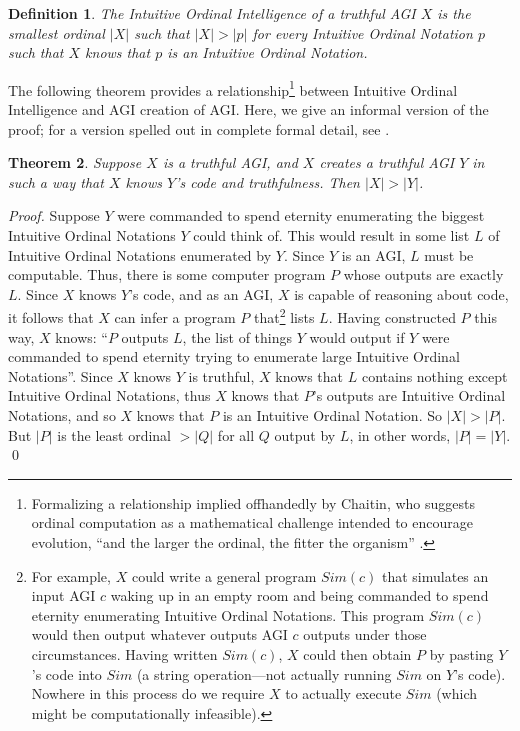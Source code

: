 \documentclass[runningheads]{llncs}
\newtheorem{mytheorem}{Theorem}
\newtheorem{mydefinition}[mytheorem]{Definition}
\begin{document}
\begin{mydefinition}
\label{maindefinition}
    The \emph{Intuitive Ordinal Intelligence} of a truthful AGI $X$ is the smallest
    ordinal $|X|$ such that $|X|>|p|$ for every Intuitive Ordinal Notation
    $p$ such that $X$ knows that $p$ is an
    Intuitive Ordinal Notation.
\end{mydefinition}

The following theorem provides a relationship\footnote{Formalizing a relationship implied
offhandedly by Chaitin, who suggests ordinal computation as a mathematical challenge
intended to encourage evolution, ``and the larger the ordinal,
the fitter the organism'' \cite{chaitin}.} between Intuitive Ordinal Intelligence
and AGI creation of AGI. Here, we give an informal version of the proof; for a version
spelled out in complete formal detail, see \cite{alexander2019measuring}.

\begin{mytheorem}
\label{maintheorem}
    Suppose $X$ is a truthful AGI, and $X$ creates a truthful AGI $Y$
    in such a way that $X$ knows $Y$'s code and truthfulness. Then
    $|X|>|Y|$.
\end{mytheorem}

\begin{proof}
    Suppose $Y$ were commanded to
    spend eternity enumerating the biggest Intuitive Ordinal Notations $Y$ could
    think of. This would result in some list $L$ of Intuitive Ordinal Notations
    enumerated by $Y$. Since $Y$ is an AGI, $L$ must be computable. Thus, there
    is some computer program
    $P$ whose outputs are exactly $L$.
    Since $X$ knows $Y$'s code,
    and as an AGI, $X$ is capable of reasoning about code,
    it follows that $X$ can infer a program $P$ that\footnote{For example,
    $X$ could write a general program $Sim(c)$ that simulates an input AGI $c$
    waking up in an empty room and being commanded
    to spend eternity enumerating Intuitive Ordinal Notations. This program $Sim(c)$
    would then output whatever outputs AGI $c$ outputs under those
    circumstances. Having written $Sim(c)$, $X$ could then obtain $P$ by
    pasting $Y$'s code into $Sim$ (a string operation---not actually running $Sim$
    on $Y$'s code).
    Nowhere in this process do we require $X$ to actually
    execute $Sim$ (which might be computationally infeasible).} lists $L$.
    Having constructed $P$ this way, $X$ knows: ``$P$ outputs
    $L$, the list of things $Y$ would output if $Y$ were commanded to spend eternity
    trying to enumerate large Intuitive Ordinal Notations''.
    Since $X$ knows $Y$ is truthful,
    $X$ knows that $L$ contains nothing except Intuitive Ordinal Notations,
    thus $X$ knows that $P$'s outputs are Intuitive Ordinal Notations,
    and so $X$ knows that $P$ is an Intuitive Ordinal Notation.
    So $|X|>|P|$. But $|P|$ is
    the least ordinal $>|Q|$ for all $Q$ output by $L$, in other words,
    $|P|=|Y|$.
    \qed
\end{proof}
\end{document}
